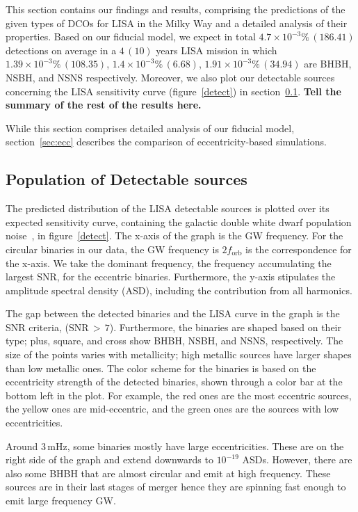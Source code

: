 \documentclass[12pt, journal, onecolumn]{IEEEtran}
\begin{document}
    This section contains our findings and results, comprising the predictions of the given types of DCOs for LISA in the Milky Way and a detailed analysis of their properties.
    Based on our fiducial model, we expect in total $4.7\times 10^{-3}\%\,(186.41)$ detections on average in a $4\,(10)$ years LISA mission in which $1.39\times 10^{-3}\%\,(108.35)$, $1.4\times 10^{-3}\%\,(6.68)$, $1.91\times 10^{-3}\%\,(34.94)$ are BHBH, NSBH, and NSNS respectively.
    Moreover, we also plot our detectable sources concerning the LISA sensitivity curve (figure~\ref{detect}) in section~\ref{subsec:r11}. \textbf{Tell the summary of the rest of the results here.}

    While this section comprises detailed analysis of our fiducial model, section~\ref{sec:ecc} describes the comparison of
    eccentricity-based simulations.

    \subsection{Population of Detectable sources} \label{subsec:r11}
    The predicted distribution of the LISA detectable sources is plotted over its expected sensitivity curve, containing the galactic double white dwarf population noise~\cite{Robson2019}, in figure~\ref{detect}.
    The x-axis of the graph is the GW frequency.
    For the circular binaries in our data, the GW frequency is $2f_\text{orb}$ is the correspondence for the x-axis.
    We take the dominant frequency, the frequency accumulating the largest SNR, for the eccentric binaries.
    Furthermore, the y-axis stipulates the amplitude spectral density (ASD), including the contribution from all harmonics.

    The gap between the detected binaries and the LISA curve in the graph is the SNR criteria, ($\text{SNR}\,>\,7$). Furthermore, the binaries are shaped based on their type; plus, square, and cross show BHBH, NSBH, and NSNS, respectively.
    The size of the points varies with metallicity; high metallic sources have larger shapes than low metallic ones.
    The color scheme for the binaries is based on the eccentricity strength of the detected binaries, shown through a color bar at the bottom left in the plot.
    For example, the red ones are the most eccentric sources, the yellow ones are mid-eccentric, and the green ones are the sources with low eccentricities.

    Around $3\,\text{mHz}$, some binaries mostly have large eccentricities.
    These are on the right side of the graph and extend downwards to $10^{-19}$ ASDs. However, there are also some BHBH that are almost circular and emit at high frequency.
    These sources are in their last stages of merger hence they are spinning fast enough to emit large frequency GW\@.
\end{document}
